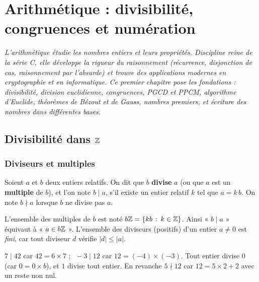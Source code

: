 \chapter{Arithmétique : divisibilité, congruences et numération}

\noindent\textit{L'arithmétique étudie les nombres entiers et leurs propriétés. Discipline
reine de la série C, elle développe la rigueur du raisonnement (récurrence, disjonction
de cas, raisonnement par l'absurde) et trouve des applications modernes en cryptographie
et en informatique. Ce premier chapitre pose les fondations : divisibilité, division
euclidienne, congruences, PGCD et PPCM, algorithme d'Euclide, théorèmes de Bézout et
de Gauss, nombres premiers, et écriture des nombres dans différentes bases.}
\vspace{8pt}

\section{Divisibilité dans $\mathbb{Z}$}

\subsection{Diviseurs et multiples}

\begin{definition}[Divisibilité]
Soient $a$ et $b$ deux entiers relatifs. On dit que $b$ \textbf{divise} $a$ (ou que $a$ est un \textbf{multiple} de $b$), et l'on note $b\mid a$, s'il existe un entier relatif $k$ tel que $a=k\,b$. On note $b\nmid a$ lorsque $b$ ne divise pas $a$.
\end{definition}

\begin{remarque}
L'ensemble des multiples de $b$ est noté $b\mathbb{Z}=\{k b\,:\,k\in\mathbb{Z}\}$. Ainsi « $b\mid a$ » équivaut à « $a\in b\mathbb{Z}$ ». L'ensemble des diviseurs (positifs) d'un entier $a\neq 0$ est \emph{fini}, car tout diviseur $d$ vérifie $|d|\le |a|$.
\end{remarque}

\begin{exemple}
$7\mid 42$ car $42=6\times 7$ ; $\;-3\mid 12$ car $12=(-4)\times(-3)$. Tout entier divise $0$ (car $0=0\times b$), et $1$ divise tout entier. En revanche $5\nmid 12$ car $12=5\times 2+2$ avec un reste non nul.
\end{exemple}


